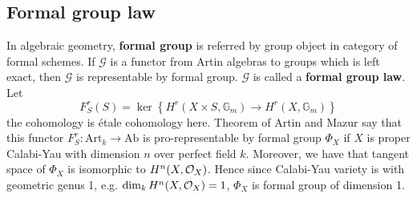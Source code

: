 \documentclass[11pt,a4paper]{scmsnotes}
\begin{document}
\subsection{Formal group law}
In algebraic geometry, \textbf{formal group} is referred by group object in category of formal schemes. If $\mathcal{G}$ is a functor from Artin algebras to groups which is left exact, then $\mathcal{G}$ is representable by formal group. $\mathcal{G}$ is called a \textbf{formal group law}.
Let 
\[
F_S^r(S)= \ker \left\{ H^r(X \times S, \mathbb{G}_m) \to H^r(X,\mathbb{G}_m)\right\}
\]
the cohomology is \'etale cohomology here. Theorem of Artin and Mazur say that this functor $F^r_S: \text{Art}_k \to \text{Ab}$ is pro-representable by formal group $\Phi_X$ if $X$ is proper Calabi-Yau with dimension $n$ over perfect field $k$. Moreover, we have that tangent space of $\Phi_X$ is isomorphic to $H^n(X, \mathcal{O}_{X})$. Hence since Calabi-Yau variety is with geometric genus 1, e.g. $\dim_k H^n(X, \mathcal{O}_{X})=1 $, $\Phi_X$ is formal group of dimension 1.  

\end{document}
